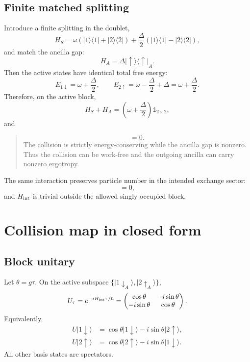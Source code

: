 \documentclass[11pt,a4paper]{article}
\newcommand{\ket}[1]{|#1\rangle}
\newcommand{\proj}[1]{|#1\rangle\langle #1|}
\newcommand{\id}{\mathbb{1}}
\newenvironment{resultbox}{\begin{quote}\small\color{blue!40!black}}{\end{quote}}
\begin{document}
\subsection{Finite matched splitting}

Introduce a finite splitting in the doublet,
\begin{equation}
H_S=\omega(\proj{1}+\proj{2})+\frac{\Delta}{2}(\proj{1}-\proj{2}),
\end{equation}
and match the ancilla gap:
\begin{equation}
H_A=\Delta\proj{\uparrow}_A.
\end{equation}
Then the active states have identical total free energy:
\begin{equation}
E_{1\downarrow}=\omega+\frac{\Delta}{2},
\qquad
E_{2\uparrow}=\omega-\frac{\Delta}{2}+\Delta=\omega+\frac{\Delta}{2}.
\end{equation}
Therefore, on the active block,
\begin{equation}
H_S+H_A=\left(\omega+\frac{\Delta}{2}\right)\id_{2\times2},
\end{equation}
and
\begin{resultbox}
\begin{equation}
[H_S+H_A,H_{\rm int}]=0.
\end{equation}
The collision is strictly energy-conserving while the ancilla gap is nonzero. Thus the collision can be work-free and the outgoing ancilla can carry nonzero ergotropy.
\end{resultbox}

The same interaction preserves particle number in the intended exchange sector:
\begin{equation}
[H_{\rm int},N_S+N_A]=0,
\end{equation}
and $H_{\rm int}$ is trivial outside the allowed singly occupied block.

\section{Collision map in closed form}\label{sec:collision}

\subsection{Block unitary}

Let $\theta=g\tau$. On the active subspace $\{\ket{1\downarrow_A},\ket{2\uparrow_A}\}$,
\begin{equation}
U_\tau=e^{-iH_{\rm int}\tau/\hbar}=\begin{pmatrix}
\cos\theta & -i\sin\theta\\
-i\sin\theta & \cos\theta
\end{pmatrix}.
\end{equation}
Equivalently,
\begin{align}
U\ket{1\downarrow}&=\cos\theta\ket{1\downarrow}-i\sin\theta\ket{2\uparrow},\\
U\ket{2\uparrow}&=\cos\theta\ket{2\uparrow}-i\sin\theta\ket{1\downarrow}.
\end{align}
All other basis states are spectators.
\end{document}
